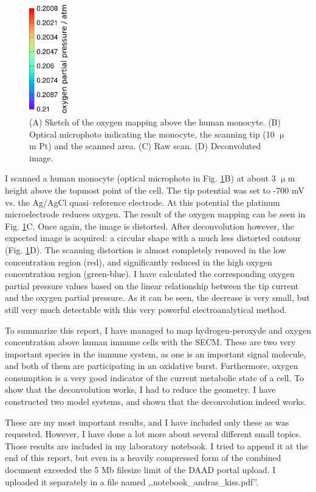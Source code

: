 \documentclass[a4paper, 11pt, oneside, bibliography=totoc]{article}
\begin{document}
\begin{figure}
\includegraphics[width=0.15\textwidth, angle=-90]{atm.eps}

\caption{(A) Sketch of the oxygen mapping above the human monocyte. (B) Optical microphoto indicating the monocyte, the scanning tip (10  $\upmu$m Pt) and the scanned area. (C) Raw scan. (D) Deconvoluted image.}
\label{fig:ox}
\end{figure}

I scanned a human monocyte (optical microphoto in Fig. \ref{fig:ox}B) at about 3 $\upmu$m height above the topmost point of the cell. The tip potential was set to -700 mV vs. the Ag/AgCl quasi--reference electrode. At this potential the platinum microelectrode reduces oxygen. The result of the oxygen mapping can be seen in Fig. \ref{fig:ox}C. Once again, the image is distorted. After deconvolution however, the expected image is acquired: a circular shape with a much less distorted contour (Fig. \ref{fig:ox}D). The scanning distortion is almost completely removed in the low concentration region (red), and significantly reduced in the high oxygen concentration region (green-blue). I have calculated the corresponding oxygen partial pressure values based on the linear relationship between the tip current and the oxygen partial pressure. As it can be seen, the decrease is very small, but still very much detectable with this very powerful electroanalytical method.

To summarize this report, I have managed to map hydrogen-peroxyde and oxygen concentration above human immune cells with the SECM. These are two very important species in the immune system, as one is an important signal molecule, and both of them are participating in an oxidative burst. Furthermore, oxygen consumption is a very good indicator of the current metabolic state of a cell. To show that the deconvolution works, I had to reduce the geometry. I have constructed two model systems, and shown that the deconvolution indeed works. 

These are my most important results, and I have included only these as was requested. However, I have done a lot more about several different small topics.  Those results are included in my laboratory notebook. I tried to append it at the end of this report, but even in a heavily compressed form of the combined document exceeded the 5 Mb filesize limit of the DAAD portal upload. I uploaded it separately in a file named ,,notebook\_andras\_kiss.pdf''.
\end{document}
